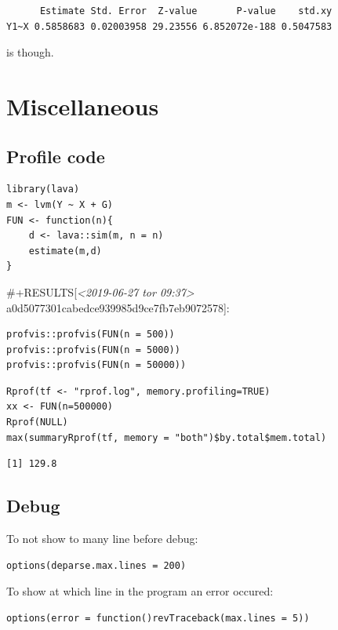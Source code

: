 \documentclass{article}
\begin{document}
\begin{verbatim}
      Estimate Std. Error  Z-value       P-value    std.xy
Y1~X 0.5858683 0.02003958 29.23556 6.852072e-188 0.5047583
\end{verbatim}

is though.

\section{Miscellaneous}
\label{sec:org70563ba}
\subsection{Profile code}
\label{sec:org6132000}

\lstset{language=r,label= ,caption= ,captionpos=b,numbers=none}
\begin{lstlisting}
library(lava)
m <- lvm(Y ~ X + G)
FUN <- function(n){
    d <- lava::sim(m, n = n)
    estimate(m,d)
}
\end{lstlisting}

\#+RESULTS[\textit{<2019-06-27 tor 09:37> } a0d5077301cabedce939985d9ce7fb7eb9072578]:

\lstset{language=r,label= ,caption= ,captionpos=b,numbers=none}
\begin{lstlisting}
profvis::profvis(FUN(n = 500))
profvis::profvis(FUN(n = 5000))
profvis::profvis(FUN(n = 50000))
\end{lstlisting}

\lstset{language=r,label= ,caption= ,captionpos=b,numbers=none}
\begin{lstlisting}
Rprof(tf <- "rprof.log", memory.profiling=TRUE)
xx <- FUN(n=500000)
Rprof(NULL)
max(summaryRprof(tf, memory = "both")$by.total$mem.total)
\end{lstlisting}

\begin{verbatim}
[1] 129.8
\end{verbatim}

\subsection{Debug}
\label{sec:orgbaf2d37}
To not show to many line before debug:
\lstset{language=r,label= ,caption= ,captionpos=b,numbers=none}
\begin{lstlisting}
options(deparse.max.lines = 200)
\end{lstlisting}

To show at which line in the program an error occured:
\lstset{language=r,label= ,caption= ,captionpos=b,numbers=none}
\begin{lstlisting}
options(error = function()revTraceback(max.lines = 5))
\end{lstlisting}
\end{document}
